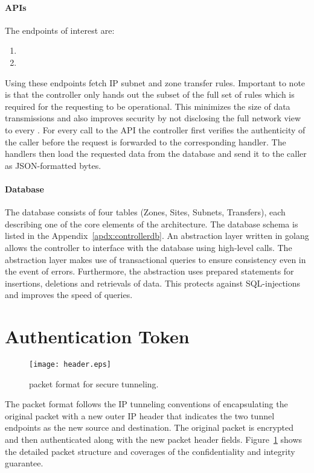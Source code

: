 \paragraph{APIs}
The endpoints of interest are:
\begin{enumerate}
    \item {}
    \item {}
\end{enumerate}
Using these endpoints \tps fetch IP subnet and zone transfer rules. Important to note is that
the controller only hands out the subset of the full set of rules which is required for the
requesting \tp to be operational. This minimizes the size of data transmissions and also
improves security by not disclosing the full network view to every \tp. For every call to the
API the controller first verifies the authenticity of the caller before the request is forwarded
to the corresponding handler. The handlers then load the requested data from the database and
send it to the caller as JSON-formatted bytes.

\paragraph{Database}
The database consists of four tables (Zones, Sites, Subnets, Transfers), each describing one of
the core elements of the architecture.
The database schema is listed in the Appendix~\ref{apdx:controllerdb}. An abstraction layer
written in golang allows the controller to interface with the database using high-level calls.
The abstraction layer makes use of transactional queries to ensure consistency even in the event
of errors. Furthermore, the abstraction uses prepared statements for insertions, deletions and
retrievals of data. This protects against SQL-injections and improves the speed of queries.


\section{Authentication Token}
\label{sec:token}

\begin{figure}[htb]
	\begin{center}
		\texttt{[image: header.eps]}
	\end{center}
	\caption{\name packet format for secure tunneling.}
	\label{fig:header}
\end{figure}

The \name packet format follows the IP tunneling conventions of encapsulating the original
packet with a new outer IP header that indicates the two tunnel endpoints as the new source
and destination. The original packet is encrypted and then authenticated along with the new
packet header fields. Figure~\ref{fig:header} shows the detailed packet structure and coverages
of the confidentiality and integrity guarantee.

